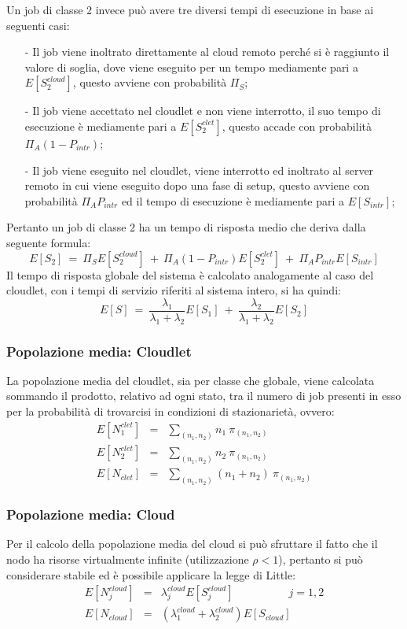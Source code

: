 Un job di classe 2 invece può avere tre diversi tempi di esecuzione in base ai
seguenti casi:
\begin{itemize}
\item[-]Il job viene inoltrato direttamente al cloud remoto perché si è
raggiunto il valore di soglia, dove viene eseguito per un tempo mediamente pari
a $E[S_2^{cloud}]$, questo avviene con probabilità $\Pi_S$;
\item[-]Il job viene accettato nel cloudlet e non viene interrotto, il suo tempo
di esecuzione è mediamente pari a $E[S_2^{clet}]$, questo accade con probabilità
$\Pi_A (1 - P_{intr})$;
\item[-]Il job viene eseguito nel cloudlet, viene interrotto ed inoltrato al
server remoto in cui viene eseguito dopo una fase di setup, questo avviene con
probabilità $\Pi_A P_{intr}$ ed il tempo di esecuzione è mediamente pari a 
$E[S_{intr}]$; 
\end{itemize}
Pertanto un job di classe 2 ha un tempo di risposta medio che deriva dalla
seguente formula:
\begin{equation}
E[S_2] \ = \
\Pi_S E[S_2^{cloud}] \ + \ \Pi_A (1-P_{intr}) E[S_2^{clet}] \ + \ 
\Pi_A P_{intr} E[S_{intr}]
\end{equation}
Il tempo di risposta globale del sistema è calcolato analogamente al caso del
cloudlet, con i tempi di servizio riferiti al sistema intero, si ha quindi:
\begin{equation}
E[S] \ = \
\frac{\lambda_1}{\lambda_1+\lambda_2}  E[S_1] \ + \
\frac{\lambda_2}{\lambda_1+\lambda_2}  E[S_2] 
\end{equation}
%
%
\subsubsection{Popolazione media: Cloudlet}
La popolazione media del cloudlet, sia per classe che globale, viene calcolata
sommando il prodotto, relativo ad ogni stato, tra il numero di job presenti in
esso per la probabilità di trovarcisi in condizioni di stazionarietà, ovvero:
\begin{eqnarray}
E[N_1^{clet}] &=& \sum_{(n_1,n_2)} n_1 \ \pi_{(n_1,n_2)} \\
E[N_2^{clet}] &=& \sum_{(n_1,n_2)} n_2 \ \pi_{(n_1,n_2)} \\
E[N_{clet}] &=& \sum_{(n_1,n_2)} (n_1+n_2) \ \pi_{(n_1,n_2)} 
\end{eqnarray}
%
\subsubsection{Popolazione media: Cloud}
Per il calcolo della popolazione media del cloud si può sfruttare il fatto che
il nodo ha risorse virtualmente infinite (utilizzazione $\rho < 1$), pertanto si
può considerare stabile ed è possibile applicare la legge di Little:
\begin{eqnarray}
E[N_j^{cloud}] &=& \lambda_j^{cloud} E[S_j^{cloud}]  \qquad\quad\qquad j=1,2 \\
E[N_{cloud}] &=& (\lambda_1^{cloud} + \lambda_2^{cloud}) E[S_{cloud}]
\end{eqnarray}
%
